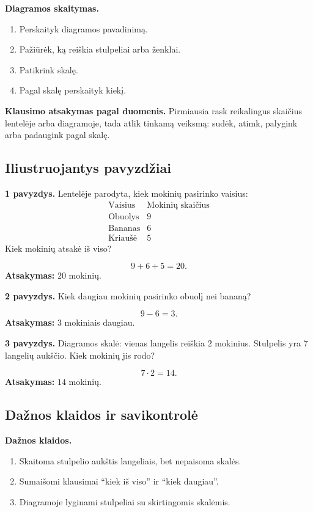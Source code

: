 \textbf{Diagramos skaitymas.}
\begin{enumerate}[label=\arabic*.]
\item Perskaityk diagramos pavadinimą.
\item Pažiūrėk, ką reiškia stulpeliai arba ženklai.
\item Patikrink skalę.
\item Pagal skalę perskaityk kiekį.
\end{enumerate}

\textbf{Klausimo atsakymas pagal duomenis.}
Pirmiausia rask reikalingus skaičius lentelėje arba diagramoje, tada atlik tinkamą veiksmą: sudėk, atimk, palygink arba padaugink pagal skalę.

\subsection{Iliustruojantys pavyzdžiai}

\textbf{1 pavyzdys.} Lentelėje parodyta, kiek mokinių pasirinko vaisius:
\[
\begin{array}{c|c}
\text{Vaisius} & \text{Mokinių skaičius}\\ \hline
\text{Obuolys} & 9\\
\text{Bananas} & 6\\
\text{Kriaušė} & 5
\end{array}
\]
Kiek mokinių atsakė iš viso?

\[
9+6+5=20.
\]
\textbf{Atsakymas:} \(20\) mokinių.

\textbf{2 pavyzdys.} Kiek daugiau mokinių pasirinko obuolį nei bananą?

\[
9-6=3.
\]
\textbf{Atsakymas:} \(3\) mokiniais daugiau.

\textbf{3 pavyzdys.} Diagramos skalė: vienas langelis reiškia \(2\) mokinius. Stulpelis yra \(7\) langelių aukščio. Kiek mokinių jis rodo?

\[
7\cdot2=14.
\]
\textbf{Atsakymas:} \(14\) mokinių.

\subsection{Dažnos klaidos ir savikontrolė}

\textbf{Dažnos klaidos.}
\begin{enumerate}[label=\arabic*.]
\item Skaitoma stulpelio aukštis langeliais, bet nepaisoma skalės.
\item Sumaišomi klausimai ``kiek iš viso'' ir ``kiek daugiau''.
\item Diagramoje lyginami stulpeliai su skirtingomis skalėmis.
\end{enumerate}

